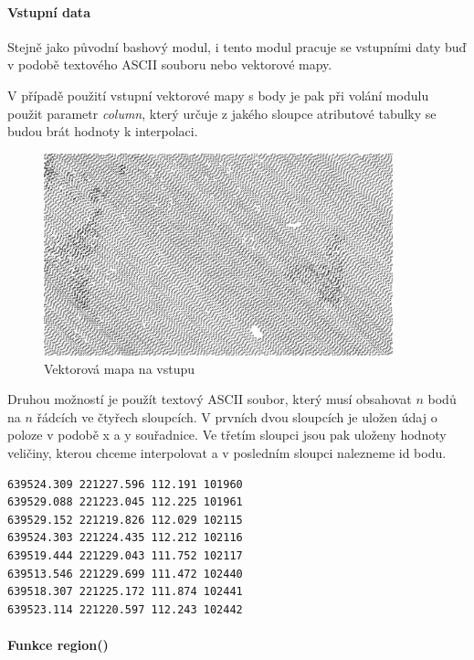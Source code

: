 \documentclass[12pt,a4paper]{article}
\begin{document}
{\paragraph{Vstupní data}

Stejně jako původní bashový modul, i tento modul pracuje se vstupními
daty buď v podobě textového ASCII souboru nebo vektorové mapy.

V případě použití vstupní vektorové mapy s body je pak při volání
modulu použit parametr \emph{column}, který určuje z jakého sloupce
atributové tabulky se budou brát hodnoty k interpolaci.

\begin{figure}[h!]
\centering
\includegraphics[width=0.9\textwidth]{img/vstup_vect_map.png}
\caption{Vektorová mapa na vstupu}
\label{fig:vstup_vect_map}
\end{figure}

\newpage

Druhou možností je použít textový ASCII soubor, který musí obsahovat
$n$ bodů na $n$ řádcích ve čtyřech sloupcích. V prvních dvou sloupcích
je uložen údaj o poloze v podobě x a y souřadnice. Ve třetím sloupci
jsou pak uloženy hodnoty veličiny, kterou chceme interpolovat a v
posledním sloupci nalezneme id bodu.

\begin{lstlisting}[caption={Příklad vstupního souboru}]
639524.309 221227.596 112.191 101960
639529.088 221223.045 112.225 101961
639529.152 221219.826 112.029 102115
639524.303 221224.435 112.212 102116
639519.444 221229.043 111.752 102117
639513.546 221229.699 111.472 102440
639518.307 221225.172 111.874 102441
639523.114 221220.597 112.243 102442
\end{lstlisting}

\bigskip
\paragraph{Funkce region()}

}
\end{document}
